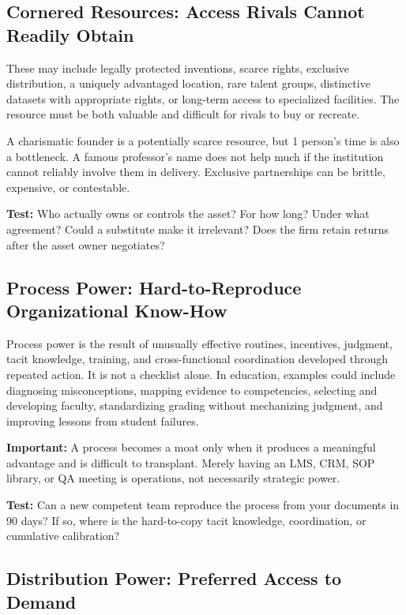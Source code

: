 \subsection{Cornered Resources: Access Rivals Cannot Readily Obtain}
\label{sec:cornered_resources}

These may include legally protected inventions, scarce rights, exclusive distribution, a uniquely advantaged location, rare talent groups, distinctive datasets with appropriate rights, or long-term access to specialized facilities. The resource must be both valuable and difficult for rivals to buy or recreate.

A charismatic founder is a potentially scarce resource, but 1 person's time is also a bottleneck. A famous professor's name does not help much if the institution cannot reliably involve them in delivery. Exclusive partnerships can be brittle, expensive, or contestable.

\textbf{Test:} Who actually owns or controls the asset? For how long? Under what agreement? Could a substitute make it irrelevant? Does the firm retain returns after the asset owner negotiates?

\subsection{Process Power: Hard-to-Reproduce Organizational Know-How}
\label{sec:process_power}

Process power is the result of unusually effective routines, incentives, judgment, tacit knowledge, training, and cross-functional coordination developed through repeated action. It is not a checklist alone. In education, examples could include diagnosing misconceptions, mapping evidence to competencies, selecting and developing faculty, standardizing grading without mechanizing judgment, and improving lessons from student failures.

\textbf{Important:} A process becomes a moat only when it produces a meaningful advantage and is difficult to transplant. Merely having an LMS, CRM, SOP library, or QA meeting is operations, not necessarily strategic power.

\textbf{Test:} Can a new competent team reproduce the process from your documents in 90 days? If so, where is the hard-to-copy tacit knowledge, coordination, or cumulative calibration?

\subsection{Distribution Power: Preferred Access to Demand}
\label{sec:distribution_power}

